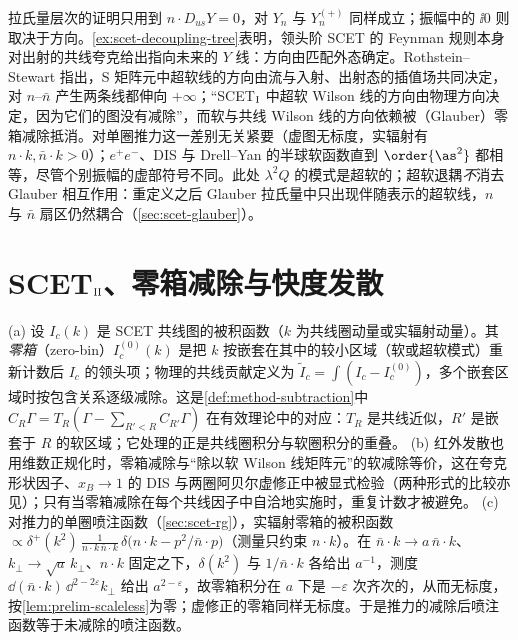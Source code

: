 \begin{remark}[$Y_n$ 的方向与 $\ii0$]\label{rem:scet-y-direction}
拉氏量层次的证明只用到 $n\cdot D_{us}Y=0$，对 $Y_n$ 与 $Y_n^{(+)}$ 同样成立；振幅中的 $\ii0$ 则取决于方向。\cref{ex:scet-decoupling-tree}表明，领头阶 SCET 的 Feynman 规则本身对出射的共线夸克给出指向未来的 $Y$ 线\cite{Chay:2004zn}：方向由匹配外态确定。Rothstein--Stewart 指出，S 矩阵元中超软线的方向由流与入射、出射态的插值场共同决定，对 $n$–$\bar n$ 产生两条线都伸向 $+\infty$\cite[第~10.1~节]{RothsteinStewart2016}；“SCET$_{\rm I}$ 中超软 Wilson 线的方向由物理方向决定，因为它们的图没有减除”，而软与共线 Wilson 线的方向依赖被（Glauber）零箱减除抵消\cite[第~4.2~节]{RothsteinStewart2016}。对单圈推力这一差别无关紧要（虚图无标度，实辐射有 $n\cdot k,\bar n\cdot k>0$）；$e^+e^-$、DIS 与 Drell--Yan 的半球软函数直到 $\order{\as^2}$ 都相等，尽管个别振幅的虚部符号不同\cite{Kang:2015moa}。此处 $\lambda^2Q$ 的模式是超软的；超软退耦\emph{不}消去 Glauber 相互作用：重定义之后 Glauber 拉氏量中只出现伴随表示的超软线，$n$ 与 $\bar n$ 扇区仍然耦合\cite[第~5.1~节]{RothsteinStewart2016}（\cref{sec:scet-glauber}）。
\end{remark}

\section{SCET\texorpdfstring{$_{\rm II}$}{II}、零箱减除与快度发散}\label{sec:scet-scet2}

\begin{definition}[零箱减除]\label{def:scet-zero-bin}
(a) 设 $I_c(k)$ 是 SCET 共线图的被积函数（$k$ 为共线圈动量或实辐射动量）。其\emph{零箱}（zero-bin）$I_c^{(0)}(k)$ 是把 $k$ 按嵌套在其中的较小区域（软或超软模式）重新计数后 $I_c$ 的领头项；物理的共线贡献定义为 $\tilde I_c=\int(I_c-I_c^{(0)})$，多个嵌套区域时按包含关系逐级减除\cite{ManoharStewart2007}。这是\cref{def:method-subtraction}中 $C_R\Gamma=T_R(\Gamma-\sum_{R'<R}C_{R'}\Gamma)$ 在有效理论中的对应：$T_R$ 是共线近似，$R'$ 是嵌套于 $R$ 的软区域；它处理的正是共线圈积分与软圈积分的重叠。
(b) 红外发散也用维数正规化时，零箱减除与“除以软 Wilson 线矩阵元”的软减除等价，这在夸克形状因子、$x_B\to1$ 的 DIS 与两圈阿贝尔虚修正中被显式检验\cite{IdilbiMehen2007}（两种形式的比较亦见\cite{Lee:2006nr}）；只有当零箱减除在每个共线因子中自洽地实施时，重复计数才被避免。
(c) 对推力的单圈喷注函数（\cref{sec:scet-rg}），实辐射零箱的被积函数 $\propto\delta^+(k^2)\,\frac{1}{n\cdot k\,\bar n\cdot k}\,\delta\big(n\cdot k-p^2/\bar n\cdot p\big)$（测量只约束 $n\cdot k$）。在 $\bar n\cdot k\to a\,\bar n\cdot k$、$k_\perp\to\sqrt a\,k_\perp$、$n\cdot k$ 固定之下，$\delta(k^2)$ 与 $1/\bar n\cdot k$ 各给出 $a^{-1}$，测度 $\dd(\bar n\cdot k)\,\dd^{2-2\varepsilon}k_\perp$ 给出 $a^{2-\varepsilon}$，故零箱积分在 $a$ 下是 $-\varepsilon$ 次齐次的，从而无标度，按\cref{lem:prelim-scaleless}为零；虚修正的零箱同样无标度。于是推力的减除后喷注函数等于未减除的喷注函数。%
\end{definition}

